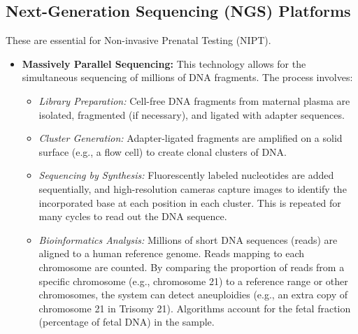 \documentclass{article}
\begin{document}
\subsection{Next-Generation Sequencing (NGS) Platforms}
These are essential for Non-invasive Prenatal Testing (NIPT).
\begin{itemize}
    \item \textbf{Massively Parallel Sequencing:} This technology allows for the simultaneous sequencing of millions of DNA fragments. The process involves:
    \begin{itemize}
        \item \textit{Library Preparation:} Cell-free DNA fragments from maternal plasma are isolated, fragmented (if necessary), and ligated with adapter sequences.
        \item \textit{Cluster Generation:} Adapter-ligated fragments are amplified on a solid surface (e.g., a flow cell) to create clonal clusters of DNA.
        \item \textit{Sequencing by Synthesis:} Fluorescently labeled nucleotides are added sequentially, and high-resolution cameras capture images to identify the incorporated base at each position in each cluster. This is repeated for many cycles to read out the DNA sequence.
        \item \textit{Bioinformatics Analysis:} Millions of short DNA sequences (reads) are aligned to a human reference genome. Reads mapping to each chromosome are counted. By comparing the proportion of reads from a specific chromosome (e.g., chromosome 21) to a reference range or other chromosomes, the system can detect aneuploidies (e.g., an extra copy of chromosome 21 in Trisomy 21). Algorithms account for the fetal fraction (percentage of fetal DNA) in the sample.
    \end{itemize}
\end{itemize}
\end{document}
